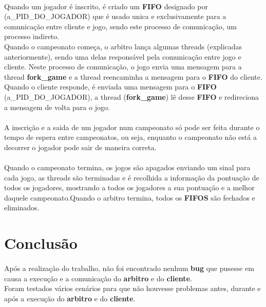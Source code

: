 \documentclass[letterpaper, 11pt]{article}
\begin{document}
\paragraph{}
Quando um jogador é inscrito, é criado um \textbf{FIFO} designado por (a\_PID\_DO\_JOGADOR) que é usado unica e exclusivamente para a comunicação entre cliente e jogo, sendo este processo de comunicação, um processo indireto.\\
Quando o campeonato começa, o arbitro lança algumas threads (explicadas anteriormente), sendo uma delas responsável pela comunicação entre jogo e cliente. Neste processo de comunicação, o jogo envia uma mensagem para a thread \textbf{fork\_game} e a thread reencaminha a mensagem para o \textbf{FIFO} do cliente. Quando o cliente responde, é enviada uma mensagem para o \textbf{FIFO} (a\_PID\_DO\_JOGADOR), a thread (\textbf{fork\_game}) lê desse \textbf{FIFO} e redireciona a mensagem de volta para o jogo.
\paragraph{}
A inscrição e a saida de um jogador num campeonato só pode ser feita durante o tempo de espera entre campeonatos, ou seja, enquanto o campeonato não está a decorrer o jogador pode sair de maneira correta.
\paragraph{}
Quando o campeonato termina, os jogos são apagados enviando um sinal para cada jogo, as threads são terminadas e é recolhida a informação da pontuação de todos os jogadores, mostrando a todos os jogadores a sua pontuação e a melhor daquele campeonato.Quando o arbitro termina, todos os \textbf{FIFOS} são fechados e eliminados.

\section{Conclusão}
\label{sec:org5a98a41}

\paragraph{}
Após a realização do trabalho, não foi encontrado nenhum \textbf{bug} que pusesse em causa a execução e a comunicação do \textbf{arbitro} e do \textbf{cliente}.\\
Foram testados vários cenários para que não houvesse problemas antes, durante e após a execução do \textbf{arbitro} e do \textbf{cliente}.
\end{document}
